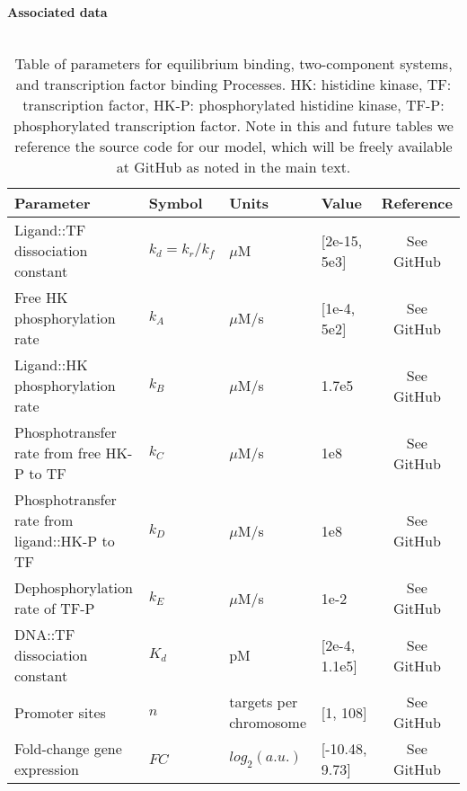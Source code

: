 \documentclass[12pt]{article}
\begin{document}
\begin{table}[H]
\hspace{16pt} \textbf{Associated data} \\\\
 \label{transcription_regulation_table}
 \begin{tabular}{p{2in} p{0.8in} p{0.9in} p{1in} c}
 \hline
 Parameter & Symbol & Units & Value & Reference \\
 \hline
Ligand::TF dissociation constant & $k_d = k_r/k_f$ & $\mu$M & [2e-15, 5e3] & See GitHub   \\
Free HK phosphorylation rate & $k_A$ & $\mu$M/s & [1e-4, 5e2] & See GitHub  \\
Ligand::HK phosphorylation rate & $k_B$ & $\mu$M/s & 1.7e5 & See GitHub  \\
Phosphotransfer rate from free HK-P to TF & $k_C$ & $\mu$M/s & 1e8 & See GitHub  \\
Phosphotransfer rate from ligand::HK-P to TF & $k_D$ & $\mu$M/s & 1e8 & See GitHub  \\
Dephosphorylation rate of TF-P & $k_E$ & $\mu$M/s & 1e-2 & See GitHub  \\
DNA::TF dissociation constant & $K_d$ & pM & [2e-4, 1.1e5] & See GitHub  \\
Promoter sites & $n$ & targets per chromosome & [1, 108] & See GitHub  \\
Fold-change gene expression & $FC$ & $log_{2}(a.u.)$ & [-10.48, 9.73] & See GitHub  \\

 \hline
\end{tabular}
\caption[Table of parameters for transcription regulation]{Table of parameters for equilibrium binding, two-component systems, and transcription factor binding Processes. HK: histidine kinase, TF: transcription factor, HK-P: phosphorylated histidine kinase, TF-P: phosphorylated transcription factor. Note in this and future tables we reference the source code for our model, which will be freely available at GitHub as noted in the main text.}
\end{table}
\end{document}
